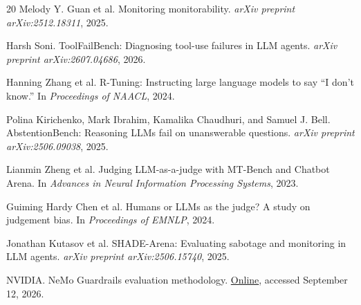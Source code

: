\documentclass[conference]{IEEEtran}
\begin{document}
\begin{thebibliography}{20}
Melody Y. Guan et al.
\newblock Monitoring monitorability.
\newblock \emph{arXiv preprint arXiv:2512.18311}, 2025.

Harsh Soni.
\newblock ToolFailBench: Diagnosing tool-use failures in LLM agents.
\newblock \emph{arXiv preprint arXiv:2607.04686}, 2026.

Hanning Zhang et al.
\newblock R-Tuning: Instructing large language models to say ``I don't know.''
\newblock In \emph{Proceedings of NAACL}, 2024.

Polina Kirichenko, Mark Ibrahim, Kamalika Chaudhuri, and Samuel J. Bell.
\newblock AbstentionBench: Reasoning LLMs fail on unanswerable questions.
\newblock \emph{arXiv preprint arXiv:2506.09038}, 2025.

Lianmin Zheng et al.
\newblock Judging LLM-as-a-judge with MT-Bench and Chatbot Arena.
\newblock In \emph{Advances in Neural Information Processing Systems}, 2023.

Guiming Hardy Chen et al.
\newblock Humans or LLMs as the judge? A study on judgement bias.
\newblock In \emph{Proceedings of EMNLP}, 2024.

Jonathan Kutasov et al.
\newblock SHADE-Arena: Evaluating sabotage and monitoring in LLM agents.
\newblock \emph{arXiv preprint arXiv:2506.15740}, 2025.

NVIDIA.
\newblock NeMo Guardrails evaluation methodology.
\newblock
\href{https://docs.nvidia.com/nemo/guardrails/evaluation/evaluation-methodology}{Online},
accessed September 12, 2026.

\end{thebibliography}
\end{document}
